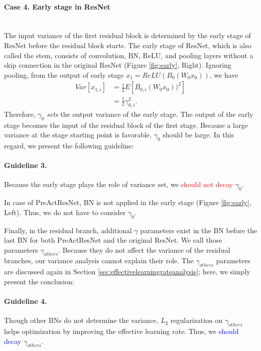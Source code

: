 \documentclass{article}
\begin{document}
\paragraph{Case 4. Early stage in ResNet} \ \\
The input variance of the first residual block is determined by the early stage of ResNet before the residual block starts. The early stage of ResNet, which is also called the stem, consists of convolution, BN, ReLU, and pooling layers without a skip connection in the original ResNet (Figure \ref{fig:early}, Right). Ignoring pooling, from the output of early stage $x_1 = ReLU(B_0(W_0 x_0))$, we have
\begin{align}
	Var[x_{1,i}] & = \frac{1}{2} E[B_{0,i}(W_0 x_0))^2] \\
	             & = \frac{1}{2} \gamma_{0,i}^2.
\end{align}
Therefore, $\gamma_0$ \emph{sets} the output variance of the early stage. The output of the early stage becomes the input of the residual block of the first stage. Because a large variance at the stage starting point is favorable, $\gamma_0$ should be large. In this regard, we present the following guideline:
\paragraph{Guideline 3.}Because the early stage plays the role of variance set, we \textcolor{red}{should not decay} $\gamma_0$.

In case of PreActResNet, BN is not applied in the early stage (Figure \ref{fig:early}, Left). Thus, we do not have to consider $\gamma_0$.

Finally, in the residual branch, additional $\gamma$ parameters exist in the BN before the last BN for both PreActResNet and the original ResNet. We call those parameters $\gamma_{others}$. Because they do not affect the variance of the residual branches, our variance analysis cannot explain their role. The $\gamma_{others}$ parameters are discussed again in Section \ref{sec:effectivelearningrateanalysis}; here, we simply present the conclusion:
\paragraph{Guideline 4.}Though other BNs do not determine the variance, $L_2$ regularization on $\gamma_{others}$ helps optimization by improving the effective learning rate. Thus, we \textcolor{blue}{should decay} $\gamma_{others}$.
\end{document}
